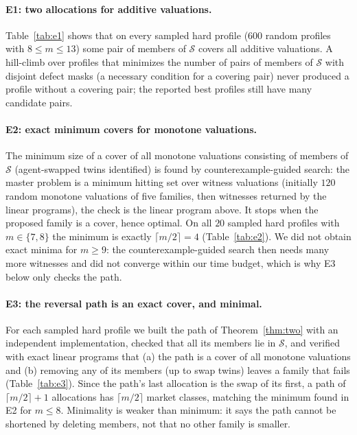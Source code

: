 \documentclass[11pt]{article}
\theoremstyle{definition}
\begin{document}
\paragraph{E1: two allocations for additive valuations.}
Table~\ref{tab:e1} shows that on every sampled hard profile (600 random profiles with $8\le m\le13$) some pair of members of $\mathcal S$ covers all additive valuations. A hill-climb over profiles that minimizes the number of pairs of members of $\mathcal S$ with disjoint defect masks (a necessary condition for a covering pair) never produced a profile without a covering pair; the reported best profiles still have many candidate pairs.


\paragraph{E2: exact minimum covers for monotone valuations.}
The minimum size of a cover of all monotone valuations consisting of members of $\mathcal S$ (agent-swapped twins identified) is found by counterexample-guided search: the master problem is a minimum hitting set over witness valuations (initially $120$ random monotone valuations of five families, then witnesses returned by the linear programs), the check is the linear program above. It stops when the proposed family is a cover, hence optimal. On all $20$ sampled hard profiles with $m\in\{7,8\}$ the minimum is exactly $\lceil m/2\rceil=4$ (Table~\ref{tab:e2}). We did not obtain exact minima for $m\ge9$: the counterexample-guided search then needs many more witnesses and did not converge within our time budget, which is why E3 below only checks the path.


\paragraph{E3: the reversal path is an exact cover, and minimal.}
For each sampled hard profile we built the path of Theorem~\ref{thm:two} with an independent implementation, checked that all its members lie in $\mathcal S$, and verified with exact linear programs that (a) the path is a cover of all monotone valuations and (b) removing any of its members (up to swap twins) leaves a family that fails (Table~\ref{tab:e3}). Since the path's last allocation is the swap of its first, a path of $\lceil m/2\rceil+1$ allocations has $\lceil m/2\rceil$ market classes, matching the minimum found in E2 for $m\le8$. Minimality is weaker than minimum: it says the path cannot be shortened by deleting members, not that no other family is smaller.

\end{document}
